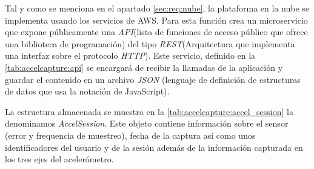 Tal y como se menciona en el apartado \ref{sec:req:nube}, la plataforma en la nube se implementa usando los servicios de AWS. Para esta función crea un microservicio que expone públicamente una \textit{API}(lista de funciones de acceso público que ofrece una biblioteca de programación) del tipo \textit{REST}(Arquitectura que implementa una interfaz sobre el protocolo \textit{HTTP}). Este servicio, definido en la \autoref{tab:accelcapture:api} se encargará de recibir la llamadas de la aplicación y guardar el contenido en un archivo \textit{JSON} (lenguaje de definición de estructuras de datos que usa la notación de JavaScript).


La estructura almacenada se muestra en la \autoref{tab:accelcapture:accel_session} la denominamos \textit{AccelSession}. Este objeto contiene información sobre el sensor (error y frequencia de muestreo), fecha de la captura así como unos identificadores del usuario y de la sesión además de la información capturada en los tres ejes del acelerómetro.



